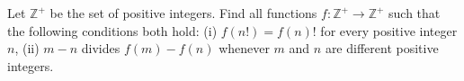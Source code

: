 Let $\mathbb{Z}^+$ be the set of positive integers. Find all functions $f:\mathbb{Z}^+ \rightarrow\mathbb{Z}^+$ such that the following conditions both hold:
(i) $f(n!)=f(n)!$ for every positive integer $n$,
(ii) $m-n$ divides $f(m)-f(n)$ whenever $m$ and $n$ are different positive integers.